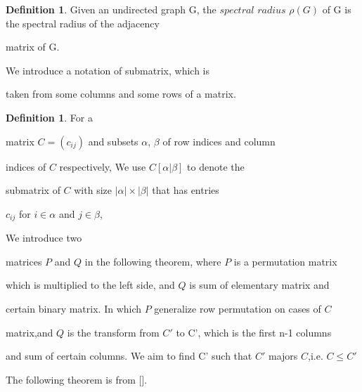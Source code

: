 \documentclass{article}
\theoremstyle{plain}
\theoremstyle{definition}
\newtheorem{defn}[thm]{Definition}
\begin{document}
    \begin{defn}
    Given an undirected graph G, the $

\textit{spectral radius}$  $\rho(G) $ of G is the spectral radius of the adjacency 

matrix of G.
    \end{defn}




    We introduce a notation of submatrix, which is 

taken from some columns and some rows of a matrix.
    \begin{defn}
        For a 

matrix $C=(c_{ij})$ and subsets $\alpha$, $\beta$ of row indices and column 

indices of 
        $C$ respectively,  We use $C[\alpha|\beta]$ to denote the 

submatrix of $C$ with size
         $ |\alpha| \times |\beta| $ that has entries 

$c_{ij}$ for $i\in \alpha$ and $j\in\beta$,
    \end{defn}


We introduce two 

matrices $P$ and $Q$ in the following theorem, where $P$ is a permutation matrix 

which is multiplied to the left side, and $Q$ is sum of elementary matrix and 

certain binary matrix. In which $P$ generalize row permutation on cases of $C$ 

matrix,and $Q$ is the transform from $C'$ to C', which is the first n-1 columns 

and sum of certain columns. We aim to find C' such that $C'$ majors $C$,i.e. $C

\leq C'$

    

The following theorem is from [].\cite{content}
\end{document}
